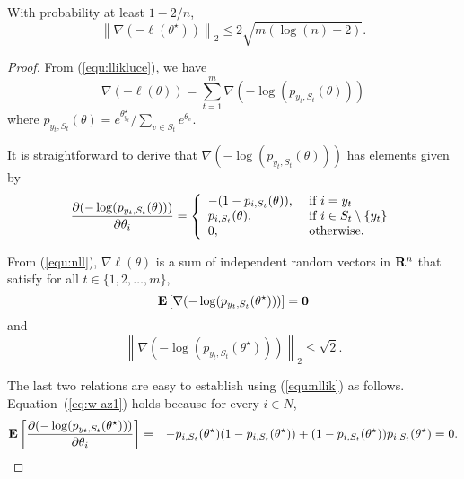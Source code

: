 
\begin{lemma} With probability at least $1-2/n$,
\begin{equation}
\left\| \nabla (-\ell (\theta^\star)) \right\|_2 \le  2\sqrt{m (\log (n)+2)}. 
\label{eq:w-u}
\end{equation}
\label{lem:L12}
\end{lemma}

\begin{proof}
From (\ref{equ:llikluce}), we have
\begin{equation}
\nabla(-\ell(\theta)) = \sum_{t=1}^m \nabla(-\log(p_{y_t,S_t}(\theta)))
\label{equ:nll}
\end{equation}
where $p_{y_t,S_t}(\theta) = e^{\theta^\star_{y_t}}/\sum_{v\in S_t}e^{\theta_v}$. 

It is straightforward to derive that $\nabla(-\log(p_{y_t,S_t}(\theta)))$ has elements given by
\begin{equation}
\frac{\partial (-\log(p_{y_t,S_t}(\theta)))}{\partial \theta_i}  = \left \{
\begin{array}{ll}
-(1-p_{i,S_t}(\theta)), & \hbox{ if } i = y_t\\
p_{i,S_t}(\theta), & \hbox{ if } i\in S_t\setminus \{y_t\}\\
0, & \hbox{ otherwise}.
\end{array}
\right .
\label{equ:nllik}
\end{equation}

From (\ref{equ:nll}), $\nabla \ell(\theta)$ is a sum of independent random vectors in $\mathbf{R}^n$ that satisfy for all $t\in \{1,2,\ldots,m\}$,
\begin{equation}
\mathbf{E}\left[\nabla (-\log(p_{y_t,S_t}(\theta^\star)))\right] = \mathbf{0} 
\label{eq:w-az1}
\end{equation}
and
\begin{equation}
\left\|\nabla(-\log(p_{y_t,S_t}(\theta^\star)))\right\|_2 \leq \sqrt{2}.
\label{eq:w-az2}
\end{equation}

The last two relations are easy to establish using (\ref{equ:nllik}) as follows. Equation~(\ref{eq:w-az1}) holds because for every $i\in N$,
\begin{eqnarray*}
\mathbf{E}\left[\frac{\partial (-\log(p_{y_t,S_t}(\theta^\star)))}{\partial \theta_i}\right]
&=& -p_{i,S_t}(\theta^\star)(1-p_{i,S_t}(\theta^\star)) + (1-p_{i,S_t}(\theta^\star))p_{i,S_t}(\theta^\star) = 0.
\end{eqnarray*}


\end{proof}
